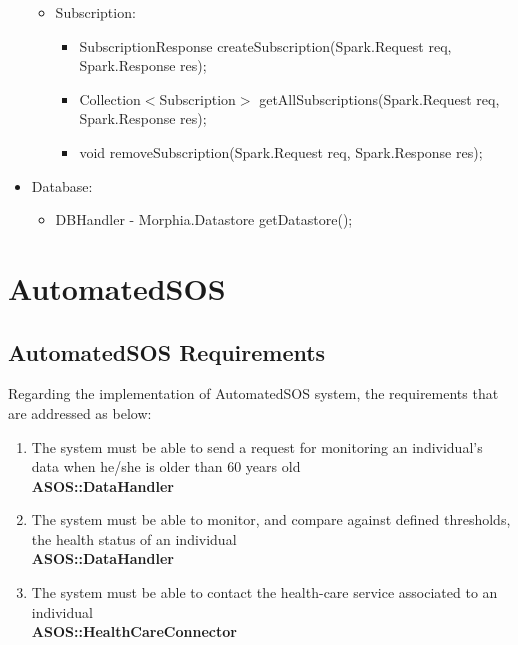 \documentclass[a4paper, hidelinks, 12pt]{report}
\newcommand\requirement[1]{\item[{[R#1]}] }
\begin{document}
\begin{itemize}
\begin{itemize}
 \item{} Subscription:
\begin{itemize}
\item{} SubscriptionResponse createSubscription(Spark.Request req, Spark.Response res);
\item{} Collection$<$Subscription$>$ getAllSubscriptions(Spark.Request req, Spark.Response res);
\item{} void removeSubscription(Spark.Request req, Spark.Response res);
\end{itemize}

\end{itemize}
\item{} Database:
\begin{itemize}
\item{} DBHandler - Morphia.Datastore getDatastore();
\end{itemize}
\end{itemize}

\section{\textbf{AutomatedSOS}}
\subsection{AutomatedSOS Requirements}
Regarding the implementation of AutomatedSOS system, the requirements that are addressed as below:
	\begin{enumerate}
		\requirement{13} The system must be able to send a request for monitoring an individual's data when he/she is older than 60 years old \\
		\textbf{ASOS::DataHandler}
		\requirement{14} The system must be able to monitor, and compare against defined thresholds, the health status of an individual \\
		\textbf{ASOS::DataHandler}
		\requirement{15} The system must be able to contact the health-care service associated to an individual \\
		\textbf{ASOS::HealthCareConnector}
	\end{enumerate}
\end{document}

